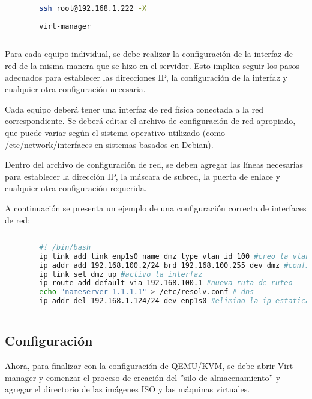 		\begin{lstlisting}[language=Bash, caption=ssh]
		
		ssh root@192.168.1.222 -X
		
		virt-manager
		
		\end{lstlisting}
		
		Para cada equipo individual, se debe realizar la configuración de la interfaz de red de la misma manera que se hizo en el servidor. Esto implica seguir los pasos adecuados para establecer las direcciones IP, la configuración de la interfaz y cualquier otra configuración necesaria.
		
		Cada equipo deberá tener una interfaz de red física conectada a la red correspondiente. Se deberá editar el archivo de configuración de red apropiado, que puede variar según el sistema operativo utilizado (como /etc/network/interfaces en sistemas basados en Debian).
		
		Dentro del archivo de configuración de red, se deben agregar las líneas necesarias para establecer la dirección IP, la máscara de subred, la puerta de enlace y cualquier otra configuración requerida.\par
		
		A continuación se presenta un ejemplo de una configuración correcta de interfaces de red:
		
		\begin{lstlisting}[language=Bash, caption=Configurar Interfaz]
		
		#! /bin/bash
		ip link add link enp1s0 name dmz type vlan id 100 #creo la vlan
		ip addr add 192.168.100.2/24 brd 192.168.100.255 dev dmz #configuro la ip
		ip link set dmz up #activo la interfaz
		ip route add default via 192.168.100.1 #nueva ruta de ruteo
		echo "nameserver 1.1.1.1" > /etc/resolv.conf # dns
		ip addr del 192.168.1.124/24 dev enp1s0 #elimino la ip estatica anterio
		
		\end{lstlisting}
	
		\subsection{Configuración}
				
		Ahora, para finalizar con la configuración de QEMU/KVM, se debe abrir Virt-manager y comenzar el proceso de creación del ''silo de almacenamiento'' y agregar el directorio de las imágenes ISO y las máquinas virtuales.
		
